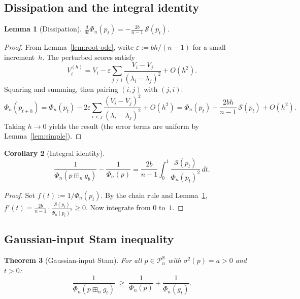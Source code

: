 \documentclass[11pt,a4paper]{amsart}
\theoremstyle{plain}
\newtheorem{theorem}{Theorem}[section]
\newtheorem{lemma}[theorem]{Lemma}
\newtheorem{corollary}[theorem]{Corollary}
\theoremstyle{definition}
\theoremstyle{remark}
\newcommand{\R}{\mathbb{R}}
\newcommand{\PnR}[1][n]{\mathcal{P}^{\R}_{#1}}
\newcommand{\fp}{\boxplus_n}
\begin{document}
\subsection{Dissipation and the integral identity}

\begin{lemma}[Dissipation]\label{lem:dissipation}
$\displaystyle\frac{d}{dt}\Phi_n(p_t)
=-\frac{2b}{n-1}\,\mathcal{S}(p_t)$.
\end{lemma}

\begin{proof}
From Lemma~\ref{lem:root-ode}, write
$\varepsilon:=bh/(n-1)$ for a small increment~$h$.
The perturbed scores satisfy
\[
  V_i^{(h)}
  =V_i-\varepsilon\sum_{j\ne i}
   \frac{V_i-V_j}{(\lambda_i-\lambda_j)^2}+O(h^2).
\]
Squaring and summing, then pairing $(i,j)$ with $(j,i)$:
\[
  \Phi_n(p_{t+h})=\Phi_n(p_t)
  -2\varepsilon\sum_{i<j}
   \frac{(V_i-V_j)^2}{(\lambda_i-\lambda_j)^2}+O(h^2)
  =\Phi_n(p_t)-\frac{2bh}{n-1}\,\mathcal{S}(p_t)+O(h^2).
\]
Taking $h\to 0$ yields the result
(the error terms are uniform by Lemma~\ref{lem:simple}).
\end{proof}

\begin{corollary}[Integral identity]\label{cor:integral}
\[
  \frac{1}{\Phi_n(p\fp g_b)}
  -\frac{1}{\Phi_n(p)}
  =\frac{2b}{n-1}\int_0^1
   \frac{\mathcal{S}(p_t)}{\Phi_n(p_t)^2}\,dt.
\]
\end{corollary}

\begin{proof}
Set $f(t):=1/\Phi_n(p_t)$.
By the chain rule and Lemma~\ref{lem:dissipation},
$f'(t)=\frac{2b}{n-1}\cdot
 \frac{\mathcal{S}(p_t)}{\Phi_n(p_t)^2}\ge 0$.
Now integrate from $0$ to~$1$.
\end{proof}


\subsection{Gaussian-input Stam inequality}

\begin{theorem}[Gaussian-input Stam]
\label{thm:gauss-stam}
For all $p\in\PnR$ with $\sigma^2(p)=a>0$ and $t>0$:
\begin{equation}\label{eq:gauss-stam}
  \frac{1}{\Phi_n(p\fp g_t)}
  \;\ge\;\frac{1}{\Phi_n(p)}+\frac{1}{\Phi_n(g_t)}.
\end{equation}
\end{theorem}
\end{document}
